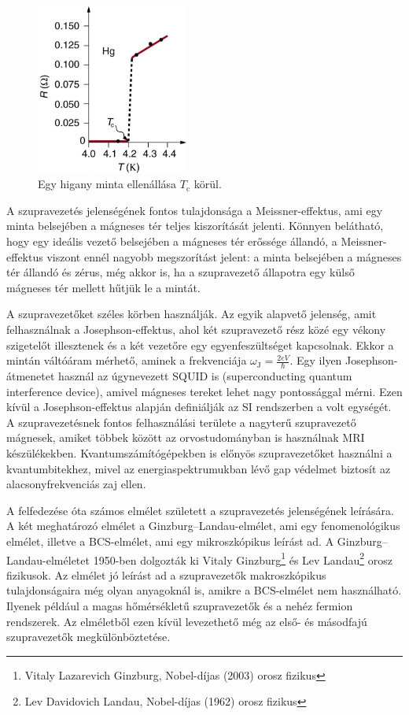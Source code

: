 \documentclass[a4paper,12pt,titlepage]{article}
\begin{document}
\begin{figure}[h!]
	\centering
	\includegraphics[width=5cm]{higany_R-vs-T.jpg}
	\caption[]{Egy higany minta ellenállása $T_\text{c}$ körül.\footnotemark}
\end{figure}

A szupravezetés jelenségének fontos tulajdonsága a Meissner-effektus, ami egy minta belsejében a mágneses tér teljes kiszorítását jelenti.  Könnyen belátható, hogy egy ideális vezető belsejében a mágneses tér erőssége állandó, a Meissner-effektus viszont ennél nagyobb megszorítást jelent: a minta belsejében a mágneses tér állandó és zérus, még akkor is, ha a szupravezető állapotra egy külső mágneses tér mellett hűtjük le a mintát.

A szupravezetőket széles körben használják.  Az egyik alapvető jelenség, amit felhasználnak a Josephson-effektus, ahol két szupravezető rész közé egy vékony szigetelőt illesztenek és a két vezetőre egy egyenfeszültséget kapcsolnak.  Ekkor a mintán váltóáram mérhető, aminek a frekvenciája $\omega_\text{J} = \frac{2e V}{\hbar}$.  Egy ilyen Josephson-átmenetet használ az úgynevezett SQUID is (superconducting quantum interference device), amivel mágneses tereket lehet nagy pontossággal mérni.  Ezen kívül a Josephson-effektus alapján definiálják az SI rendszerben a volt egységét.  A szupravezetésnek fontos felhasználási területe a nagyterű szupravezető mágnesek, amiket többek között az orvostudományban is használnak MRI készülékekben.  Kvantumszámítógépekben is előnyös szupravezetőket használni a kvantumbitekhez, mivel az energiaspektrumukban lévő gap védelmet biztosít az alacsonyfrekvenciás zaj ellen.

A felfedezése óta számos elmélet született a szupravezetés jelenségének leírására.  A két meghatározó elmélet a Ginzburg--Landau-elmélet, ami egy fenomenológikus elmélet, illetve a BCS-elmélet, ami egy mikroszkópikus leírást ad.
A Ginzburg--Landau-elméletet 1950-ben dolgozták ki Vitaly Ginzburg\footnote{Vitaly Lazarevich Ginzburg, Nobel-díjas (2003) orosz fizikus} és Lev Landau\footnote{Lev Davidovich Landau, Nobel-díjas (1962) orosz fizikus} orosz fizikusok.  Az elmélet jó leírást ad a szupravezetők makroszkópikus tulajdonságaira még olyan anyagoknál is, amikre a BCS-elmélet nem használható.  Ilyenek például a magas hőmérsékletű szupravezetők és a nehéz fermion rendszerek.  Az elméletből ezen kívül levezethető még az első- és másodfajú szupravezetők megkülönböztetése.
\end{document}
